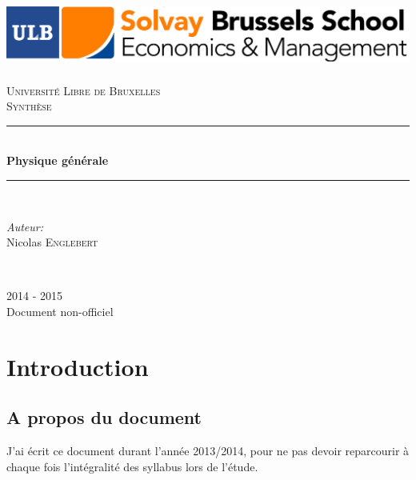 \documentclass	[11pt, a4paper, openany]{book}
\begin{document}
\renewcommand{\proofname}{Démonstration}
\frontmatter
\begin{titlepage}
\begin{center}	
	
	\newcommand{\HRule}{\rule{\linewidth}{0.5mm}}   			%
	\includegraphics[scale=0.11]{logo2.png}~\\[1cm]				%

	\textsc{\LARGE Université Libre de Bruxelles}\\[1.5cm]
	\textsc{\Large Synthèse}\\[0.5cm]

	\HRule \\[0.4cm]
	{ \huge \bfseries Physique générale \\[0.4cm] }


	\HRule \\[1.5cm]
		\begin{minipage}{0.4\textwidth}
		\begin{flushleft} \large
		
		\emph{Auteur:}\\
			Nicolas \textsc{Englebert}\\
			\end{flushleft}
			\end{minipage}
			\begin{minipage}{0.4\textwidth}
			\begin{flushright} \large
			\emph{} \\		
			\textsc{}
			\end{flushright}
		\end{minipage}

	\vfill

{\large 2014 - 2015 \\ Document non-officiel}

\end{center}
\end{titlepage}





\part{Introduction}
\chapter{A propos du document}
J'ai écrit ce document durant l'année 2013/2014, pour ne pas devoir reparcourir à chaque fois l'intégralité des syllabus lors de l'étude.\\
\end{document}
